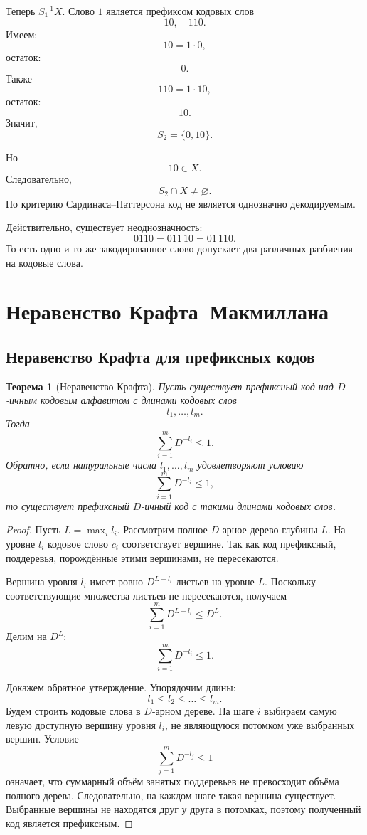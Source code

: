 \documentclass[12pt,a4paper]{article}
\newtheorem{theorem}{Теорема}[section]
\begin{document}
Теперь $S_1^{-1}X$.
Слово $1$ является префиксом кодовых слов
\[
    10,\quad 110.
\]
Имеем:
\[
    10=1\cdot 0,
\]
остаток:
\[
    0.
\]
Также
\[
    110=1\cdot 10,
\]
остаток:
\[
    10.
\]
Значит,
\[
    S_2=\{0,10\}.
\]

Но
\[
    10\in X.
\]
Следовательно,
\[
    S_2\cap X\ne\varnothing.
\]
По критерию Сардинаса--Паттерсона код не является однозначно декодируемым.

Действительно, существует неоднозначность:
\[
    0110 = 011\,10 = 01\,110.
\]
То есть одно и то же закодированное слово допускает два различных разбиения на кодовые слова.


\section{Неравенство Крафта--Макмиллана}

\subsection{Неравенство Крафта для префиксных кодов}

\begin{theorem}[Неравенство Крафта]
Пусть существует префиксный код над $D$-ичным кодовым алфавитом с длинами кодовых слов
\[
    l_1,\dots,l_m.
\]
Тогда
\[
    \sum_{i=1}^{m} D^{-l_i} \le 1.
\]
Обратно, если натуральные числа $l_1,\dots,l_m$ удовлетворяют условию
\[
    \sum_{i=1}^{m} D^{-l_i} \le 1,
\]
то существует префиксный $D$-ичный код с такими длинами кодовых слов.
\end{theorem}

\begin{proof}
Пусть $L=\max_i l_i$.
Рассмотрим полное $D$-арное дерево глубины $L$.
На уровне $l_i$ кодовое слово $c_i$ соответствует вершине.
Так как код префиксный, поддеревья, порождённые этими вершинами, не пересекаются.

Вершина уровня $l_i$ имеет ровно $D^{L-l_i}$ листьев на уровне $L$.
Поскольку соответствующие множества листьев не пересекаются, получаем
\[
    \sum_{i=1}^{m} D^{L-l_i} \le D^L.
\]
Делим на $D^L$:
\[
    \sum_{i=1}^{m} D^{-l_i} \le 1.
\]

Докажем обратное утверждение.
Упорядочим длины:
\[
    l_1\le l_2\le\dots\le l_m.
\]
Будем строить кодовые слова в $D$-арном дереве.
На шаге $i$ выбираем самую левую доступную вершину уровня $l_i$, не являющуюся потомком уже выбранных вершин.
Условие
\[
    \sum_{j=1}^{m}D^{-l_j}\le 1
\]
означает, что суммарный объём занятых поддеревьев не превосходит объёма полного дерева.
Следовательно, на каждом шаге такая вершина существует.
Выбранные вершины не находятся друг у друга в потомках, поэтому полученный код является префиксным.
\end{proof}
\end{document}
